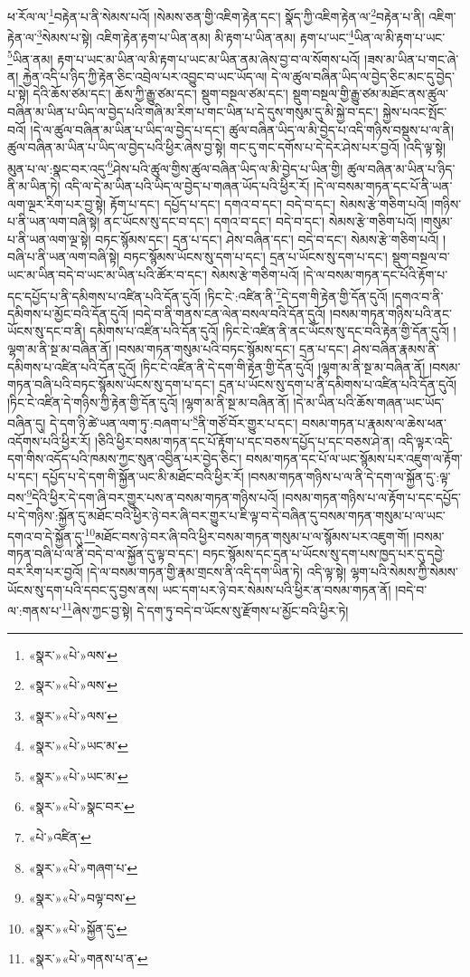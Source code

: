 ཕ་རོལ་ལ་\footnote{«སྣར་»«པེ་»ལས་}བརྟེན་པ་ནི་སེམས་པའོ། །སེམས་ཅན་གྱི་འཇིག་རྟེན་དང་། སྣོད་ཀྱི་འཇིག་རྟེན་ལ་\footnote{«སྣར་»«པེ་»ལས་}བརྟེན་པ་ནི། འཇིག་རྟེན་ལ་\footnote{«སྣར་»«པེ་»ལས་}སེམས་པ་སྟེ། འཇིག་རྟེན་རྟག་པ་ཡིན་ནམ། མི་རྟག་པ་ཡིན་ནམ། རྟག་པ་ཡང་\footnote{«སྣར་»«པེ་»ཡང་མ་}ཡིན་ལ་མི་རྟག་པ་ཡང་\footnote{«སྣར་»«པེ་»ཡང་མ་}ཡིན་ནམ། རྟག་པ་ཡང་མ་ཡིན་ལ་མི་རྟག་པ་ཡང་མ་ཡིན་ནམ་ཞེས་བྱ་བ་ལ་སོགས་པའོ། །ཟས་མ་ཡིན་པ་གང་ཞེ་ན། རྐྱེན་འདི་པ་ཉིད་ཀྱི་རྟེན་ཅིང་འབྲེལ་པར་འབྱུང་བ་ཡང་ཡོད་ལ། དེ་ལ་ཚུལ་བཞིན་ཡིད་ལ་བྱེད་ཅིང་མང་དུ་བྱེད་པ་སྟེ། དེའི་ཆོས་ཙམ་དང་། ཆོས་ཀྱི་རྒྱུ་ཙམ་དང་། སྡུག་བསྔལ་ཙམ་དང་། སྡུག་བསྔལ་གྱི་རྒྱུ་ཙམ་མཐོང་ནས་ཚུལ་བཞིན་མ་ཡིན་པ་ཡིད་ལ་བྱེད་པའི་གཞི་མ་རིག་པ་གང་ཡིན་པ་དེ་དུས་གསུམ་དུ་མི་སྐྱེ་བ་དང་། སྐྱེས་པའང་སྤོང་བའོ། །དེ་ལ་ཚུལ་བཞིན་མ་ཡིན་པ་ཡིད་ལ་བྱེད་པ་དང་། ཚུལ་བཞིན་ཡིད་ལ་མི་བྱེད་པ་འདི་གཉིས་བསྡུས་པ་ལ་ནི། ཚུལ་བཞིན་མ་ཡིན་པ་ཡིད་ལ་བྱེད་པའི་ཕྱིར་ཞེས་བྱ་སྟེ། གང་དུ་གང་དགོས་པ་དེ་དེར་ཤེས་པར་བྱའོ། །འདི་ལྟ་སྟེ། མུན་པ་ལ་:སྣང་བར་འདུ་\footnote{«སྣར་»«པེ་»སྣང་བར་}ཤེས་པའི་ཚུལ་གྱིས་ཚུལ་བཞིན་ཡིད་ལ་མི་བྱེད་པ་ཡིན་གྱི། ཚུལ་བཞིན་མ་ཡིན་པ་ཉིད་ནི་མ་ཡིན་ཏེ། འདི་ལ་དེ་མ་ཡིན་པའི་ཡིད་ལ་བྱེད་པ་གཞན་ཡོད་པའི་ཕྱིར་རོ། །དེ་ལ་བསམ་གཏན་དང་པོ་ནི་ཡན་ལག་ལྔར་རིག་པར་བྱ་སྟེ། རྟོག་པ་དང་། དཔྱོད་པ་དང་། དགའ་བ་དང་། བདེ་བ་དང་། སེམས་རྩེ་གཅིག་པའོ། །གཉིས་པ་ནི་ཡན་ལག་བཞི་སྟེ། ནང་ཡོངས་སུ་དང་བ་དང་། དགའ་བ་དང་། བདེ་བ་དང་། སེམས་རྩེ་གཅིག་པའོ། །གསུམ་པ་ནི་ཡན་ལག་ལྔ་སྟེ། བཏང་སྙོམས་དང་། དྲན་པ་དང་། ཤེས་བཞིན་དང་། བདེ་བ་དང་། སེམས་རྩེ་གཅིག་པའོ། །བཞི་པ་ནི་ཡན་ལག་བཞི་སྟེ། བཏང་སྙོམས་ཡོངས་སུ་དག་པ་དང་། དྲན་པ་ཡོངས་སུ་དག་པ་དང་། སྡུག་བསྔལ་བ་ཡང་མ་ཡིན་བདེ་བ་ཡང་མ་ཡིན་པའི་ཚོར་བ་དང་། སེམས་རྩེ་གཅིག་པའོ། །དེ་ལ་བསམ་གཏན་དང་པོའི་རྟོག་པ་དང་དཔྱོད་པ་ནི་དམིགས་པ་འཛིན་པའི་དོན་དུའོ། །ཏིང་ངེ་:འཛིན་ནི་\footnote{«པེ་»འཛིན་}དེ་དག་གི་རྟེན་གྱི་དོན་དུའོ། །དགའ་བ་ནི་དམིགས་པ་མྱོང་བའི་དོན་དུའོ། །བདེ་བ་ནི་གནས་ངན་ལེན་བསལ་བའི་དོན་དུའོ། །བསམ་གཏན་གཉིས་པའི་ནང་ཡོངས་སུ་དང་བ་ནི། དམིགས་པ་འཛིན་པའི་དོན་དུའོ། །ཏིང་ངེ་འཛིན་ནི་ནང་ཡོངས་སུ་དང་བའི་རྟེན་གྱི་དོན་དུའོ། །ལྷག་མ་ནི་སྔ་མ་བཞིན་ནོ། །བསམ་གཏན་གསུམ་པའི་བཏང་སྙོམས་དང་། དྲན་པ་དང་། ཤེས་བཞིན་རྣམས་ནི་དམིགས་པ་འཛིན་པའི་དོན་དུའོ། །ཏིང་ངེ་འཛིན་ནི་དེ་དག་གི་རྟེན་གྱི་དོན་དུའོ། །ལྷག་མ་ནི་སྔ་མ་བཞིན་ནོ། །བསམ་གཏན་བཞི་པའི་བཏང་སྙོམས་ཡོངས་སུ་དག་པ་དང་། དྲན་པ་ཡོངས་སུ་དག་པ་ནི་དམིགས་པ་འཛིན་པའི་དོན་དུའོ། །ཏིང་ངེ་འཛིན་དེ་གཉིས་ཀྱི་རྟེན་གྱི་དོན་དུའོ། །ལྷག་མ་ནི་སྔ་མ་བཞིན་ནོ། །དེ་མ་ཡིན་པའི་ཆོས་གཞན་ཡང་ཡོད་བཞིན་དུ། དེ་དག་ཉི་ཚེ་ཡན་ལག་ཏུ་:བཞག་པ་\footnote{«སྣར་»«པེ་»གཞག་པ་}ནི་གཙོ་བོར་གྱུར་པ་དང་། བསམ་གཏན་པ་རྣམས་ལ་ཆེས་ཕན་འདོགས་པའི་ཕྱིར་རོ། །ཅིའི་ཕྱིར་བསམ་གཏན་དང་པོ་རྟོག་པ་དང་བཅས་དཔྱོད་པ་དང་བཅས་ཤེ་ན། འདི་ལྟར་འདི་དག་གིས་འདོད་པའི་ཁམས་ཀྱང་སུན་འབྱིན་པར་བྱེད་ཅིང་། བསམ་གཏན་དང་པོ་ལ་ཡང་སྙོམས་པར་འཇུག་ལ་རྟོག་པ་དང་། དཔྱོད་པ་དེ་དག་གི་སྐྱོན་ཡང་མི་མཐོང་བའི་ཕྱིར་རོ། །བསམ་གཏན་གཉིས་པ་ལ་ནི་དེ་དག་ལ་སྐྱོན་དུ་:ལྟ་བས་\footnote{«སྣར་»«པེ་»བལྟ་བས་}དེའི་ཕྱིར་དེ་དག་ཞི་བར་གྱུར་པས་ན་བསམ་གཏན་གཉིས་པའོ། །བསམ་གཏན་གཉིས་པ་ལ་རྟོག་པ་དང་དཔྱོད་པ་དེ་གཉིས་:སྐྱོན་དུ་མཐོང་བའི་ཕྱིར་ཉེ་བར་ཞི་བར་གྱུར་པ་ཇི་ལྟ་བ་དེ་བཞིན་དུ་བསམ་གཏན་གསུམ་པ་ལ་ཡང་དགའ་བ་དེ་སྐྱོན་དུ་\footnote{«སྣར་»«པེ་»སྐྱོན་དུ་}མཐོང་བས་ཉེ་བར་ཞི་བའི་ཕྱིར་བསམ་གཏན་གསུམ་པ་ལ་སྙོམས་པར་འཇུག་གོ། །བསམ་གཏན་བཞི་པ་ལ་ནི་བདེ་བ་ལ་སྐྱོན་དུ་ལྟ་བ་དང་། བཏང་སྙོམས་དང་དྲན་པ་ཡོངས་སུ་དག་པས་ཁྱད་པར་དུ་དབྱེ་བར་རིག་པར་བྱའོ། །དེ་ལ་བསམ་གཏན་གྱི་རྣམ་གྲངས་ནི་འདི་དག་ཡིན་ཏེ། འདི་ལྟ་སྟེ། ལྷག་པའི་སེམས་ཀྱི་སེམས་ཡོངས་སུ་དག་པའི་དབང་དུ་བྱས་ནས། ཡང་དག་པར་ཉེ་བར་སེམས་པའི་ཕྱིར་ན་བསམ་གཏན་ནོ། །བདེ་བ་ལ་:གནས་པ་\footnote{«སྣར་»«པེ་»གནས་པ་ན་}ཞེས་ཀྱང་བྱ་སྟེ། དེ་དག་ཏུ་བདེ་བ་ཡོངས་སུ་རྫོགས་པ་མྱོང་བའི་ཕྱིར་ཏེ། 